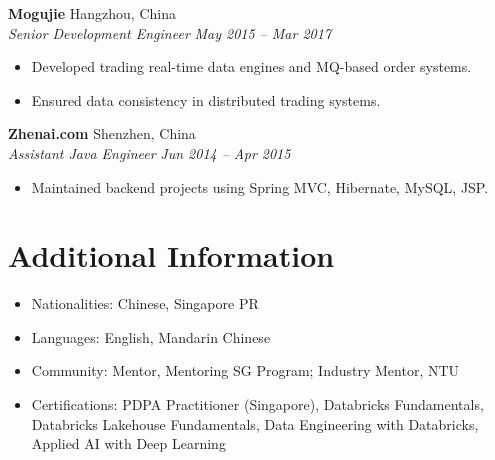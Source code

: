 \documentclass[a4paper,11pt]{article}
\newcommand{\resumeItem}[1]{\item #1}
\newcommand{\resumeSubheading}[4]{
  \vspace{1pt}\textbf{#1} \hfill #2 \\
  \textit{#3} \hfill \textit{#4}\vspace{2pt}
}
\newcommand{\resumeItemListStart}{\begin{itemize}[leftmargin=*]}
\newcommand{\resumeItemListEnd}{\end{itemize}}
\begin{document}
\resumeSubheading{Mogujie}{Hangzhou, China}{Senior Development Engineer}{May 2015 -- Mar 2017}
\resumeItemListStart
  \resumeItem{Developed trading real-time data engines and MQ-based order systems.}
  \resumeItem{Ensured data consistency in distributed trading systems.}
\resumeItemListEnd

\resumeSubheading{Zhenai.com}{Shenzhen, China}{Assistant Java Engineer}{Jun 2014 -- Apr 2015}
\resumeItemListStart
  \resumeItem{Maintained backend projects using Spring MVC, Hibernate, MySQL, JSP.}
\resumeItemListEnd

\section*{Additional Information}
\begin{itemize}[leftmargin=*]
  \item Nationalities: Chinese, Singapore PR
  \item Languages: English, Mandarin Chinese
  \item Community: Mentor, Mentoring SG Program; Industry Mentor, NTU
  \item Certifications: PDPA Practitioner (Singapore), Databricks Fundamentals, Databricks Lakehouse Fundamentals, Data Engineering with Databricks, Applied AI with Deep Learning
\end{itemize}
\end{document}
